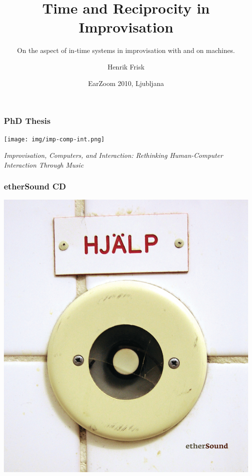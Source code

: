 \documentclass{beamer}
\title[Time and Reciprocity]
{%
  Time and Reciprocity in Improvisation
}
\subtitle[In-time performance]
{%
  On the aspect of in-time systems in improvisation with and on machines.
}
\author{Henrik Frisk}
\institute[Lund University]
{
  Malmoe Academy of Music, Lund University
}
\date{EarZoom 2010, Ljubljana}
\begin{document}
\begin{frame}
  \titlepage
\end{frame}


\begin{frame}
  \frametitle{PhD Thesis}
  \begin{center}
    \texttt{[image: img/imp-comp-int.png]}
  \end{center}
  \begin{center}
    \emph{Improvisation, Computers, and Interaction: Rethinking Human-Computer Interaction Through Music}
  \end{center}
\end{frame}

\begin{frame}
  \frametitle{etherSound CD}
  \begin{center}
    \includegraphics[width=.4\textwidth]{img/ether-cover.jpg}
  \end{center}
\end{frame}
\end{document}
